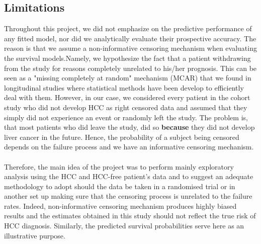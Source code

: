 \documentclass[11pt,twoside]{article}
\numberwithin{Theorem}{section}
\numberwithin{Definition}{section}
\numberwithin{Lemma}{section}
\numberwithin{Algorithm}{section}
\numberwithin{equation}{section}
\begin{document}
\subsection{Limitations}
Throughout this project, we did not emphasize on the predictive performance of any fitted model, nor did we analytically evaluate their prospective accuracy. The reason is that we assume a non-informative censoring mechanism when evaluating the survival models.Namely, we hypothesize the fact that a patient withdrawing from the study for reasons completely unrelated to his/her prognosis. This can be seen as a "missing completely at random" mechanism (MCAR) that we found in longitudinal studies where statistical methods have been develop to efficiently deal with them. However, in our case, we considered every patient in the cohort study who did not develop HCC as right censored data and assumed that they simply did not experience an event or randomly left the study. The problem is, that most patients who did leave the study, did so \textbf{because} they did not develop liver cancer in the future. Hence, the probability of a subject being censored depends on the failure process and we have an informative censoring mechanism. \\ \\
Therefore, the main idea of the project was to perform mainly exploratory analysis using the HCC and HCC-free patient's data and to suggest an adequate methodology to adopt should the data be taken in a randomised trial or in another set up making sure that the censoring process is unrelated to the failure rates. Indeed, non-informative censoring mechanism produces highly biased results and the estimates obtained in this study should not reflect the true risk of HCC diagnosis. Similarly, the predicted survival probabilities serve here as an illustrative purpose. \\ \\
%
%
\end{document}
